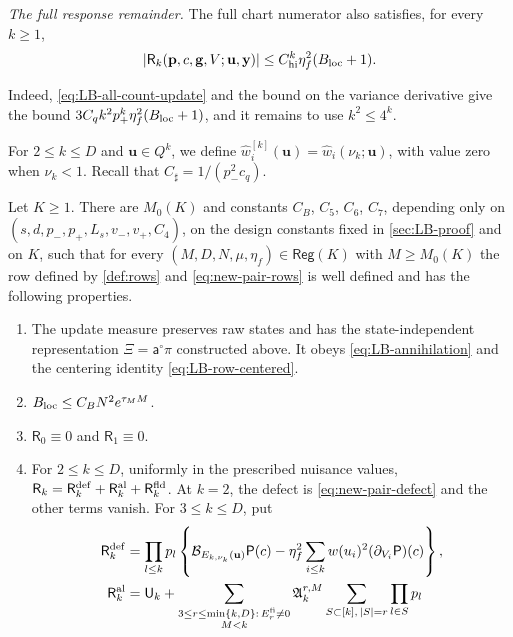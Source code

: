 \medskip\noindent\emph{The full response remainder.}
The full chart numerator also satisfies, for every $k\ge1$,
\begin{equation}\label{eq:LB-full-response}
 |\mathsf R_k(\mathbf p,c,\mathbf g,V;\mathbf u,\mathbf y)|
 \le C_{\rm hi}^k\eta_f^2(B_{\rm loc}+1).
\end{equation}

Indeed, \eqref{eq:LB-all-count-update} and the bound on the variance
derivative give the bound $3C_qk^2p_+^k\eta_f^2(B_{\rm loc}+1)$, and it
remains to use $k^2\le4^k$.

For $2\le k\le D$ and $\mathbf u\in Q^k$, we define
$\hat w_i^{[k]}(\mathbf u)=\hat w_i(\nu_k;\mathbf u)$, with value zero
when $\nu_k<1$. Recall that $C_\sharp=1/(p_-^2c_q)$.

\begin{proposition}\label{prop:local}
Let $K\ge1$. There are $M_0(K)$ and constants $C_B$, $C_5$, $C_6$, $C_7$,
depending only on $(s,d,p_-,p_+,L_s,v_-,v_+,C_4)$, on the design
constants fixed in \cref{sec:LB-proof} and on $K$, such that for
every $(M,D,N,\mu,\eta_f)\in\mathsf{Reg}(K)$ with $M\ge M_0(K)$ the row
defined by \eqref{def:rows} and \eqref{eq:new-pair-rows} is well defined and has the following properties.
\begin{enumerate}
\item[\textup{(i)}] The update measure preserves raw states and has the
state-independent representation $\Xi=\mathsf a^\circ\pi$ constructed
above. It obeys \eqref{eq:LB-annihilation} and the centering identity
\eqref{eq:LB-row-centered}.
\item[\textup{(ii)}] $B_{\rm loc}\le C_BN^2e^{\tau_MM}$.
\item[\textup{(iii)}] $\mathsf R_0\equiv0$ and $\mathsf R_1\equiv0$.
\item[\textup{(iv)}] For $2\le k\le D$, uniformly in the prescribed
nuisance values, $\mathsf R_k=\mathsf R_k^{\rm def}
+\mathsf R_k^{\rm al}+\mathsf R_k^{\rm fld}$.
At $k=2$, the defect is \eqref{eq:new-pair-defect} and the other terms
vanish. For $3\le k\le D$, put
\begin{align*}
 \mathsf R_k^{\rm def}
 &=\prod_{l\le k}p_l\left\{
 \mathcal B_{E_{k,\nu_k}(\mathbf u)}\mathsf P(c)
 -\eta_f^2\sum_{i\le k}w(u_i)^2(\partial_{V_i}\mathsf P)(c)
 \right\},\\
 \mathsf R_k^{\rm al}
 &=\mathsf U_k+
 \sum_{\substack{3\le r\le\min\{k,D\}:\,E_r^{\rm fi}\ne0\\M<k}}
 \mathfrak A^{r,M}_k
 \sum_{S\subset[k],\,|S|=r}\prod_{l\in S}p_l\,

\end{align*}
\end{enumerate}
\end{proposition}

